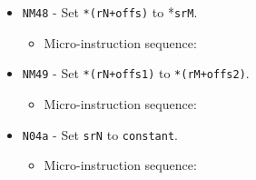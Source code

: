 \documentclass{article}
\def\specialtoaddr#1{\Verb|#1102| - output \Verb|sr#1| to addr bus}
\def\specialptodata#1{\Verb|#1202| - output *\Verb|sr#1| to data bus}
\def\pkptrout{\Verb|0202| - output *\Verb|pk| to data bus}
\def\datatooffs{\Verb|4402| - write to \Verb|offs| from data bus}
\def\incrementpk{\Verb|0502| - increment \Verb|pk|}
\def\regtoaddr#1{\Verb|#1103| - output \Verb|r#1| to addr bus}
\def\regptodatao#1{\Verb|#1303| - output *(\Verb|r#1|+\Verb|offs|) to data bus}
\def\writeRAM{\Verb|0004| - write data bus to *(addr bus)}
\def\writeRAMo{\Verb|0104| - write data bus to *(addr bus+\Verb|offs|)}
\def\echodatalong{\Verb|0025| - echo data bus to itself for 3 cycles}
\def\done{\Verb|fffe| - end instruction}
\begin{document}
\begin{itemize}
    \item \Verb|NM48| - Set \Verb|*(rN+offs)| to *\Verb|srM|.
    \begin{itemize}
        \item Micro-instruction sequence:
    \end{itemize}

    \item \Verb|NM49| - Set \Verb|*(rN+offs1)| to \Verb|*(rM+offs2)|.
    \begin{itemize}
        \item Micro-instruction sequence:
    \end{itemize}

    \item \Verb|N04a| - Set \Verb|srN| to \Verb|constant|.
    \begin{itemize}
        \item Micro-instruction sequence:
    \end{itemize}
    

\end{itemize}
\end{document}
